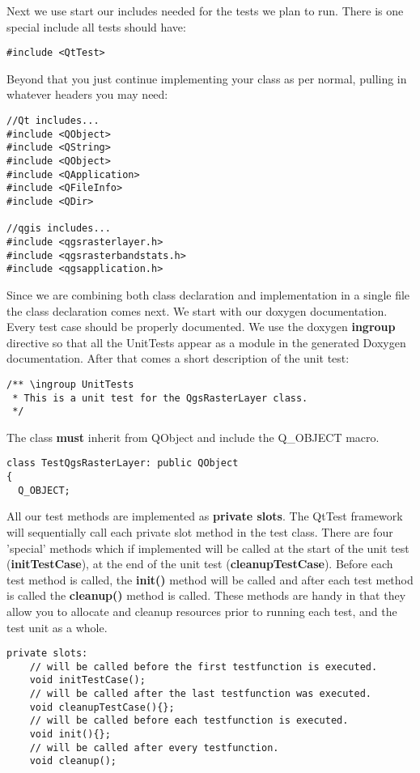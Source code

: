 Next we use start our includes needed for the tests we plan to run. There is 
one special include all tests should have:

\begin{verbatim}
#include <QtTest>
\end{verbatim}

Beyond that you just continue implementing your class as per normal, pulling 
in whatever headers you may need:

\begin{verbatim}
//Qt includes...
#include <QObject>
#include <QString>
#include <QObject>
#include <QApplication>
#include <QFileInfo>
#include <QDir>

//qgis includes...
#include <qgsrasterlayer.h> 
#include <qgsrasterbandstats.h> 
#include <qgsapplication.h>
\end{verbatim}

Since we are combining both class declaration and implementation in a single 
file the class declaration comes next. We start with our doxygen documentation. 
Every test case should be properly documented. We use the doxygen \textbf{ingroup} 
directive so that all the UnitTests appear as a module in the generated 
Doxygen documentation. After that comes a short description of the unit test:

\begin{verbatim}
/** \ingroup UnitTests
 * This is a unit test for the QgsRasterLayer class.
 */
\end{verbatim}

The class \textbf{must} inherit from QObject and include the Q\_OBJECT macro.

\begin{verbatim}
class TestQgsRasterLayer: public QObject
{
  Q_OBJECT;
\end{verbatim}

All our test methods are implemented as \textbf{private slots}. The QtTest framework 
will sequentially call each private slot method in the test class. There are 
four 'special' methods which if implemented will be called at the start of 
the unit test (\textbf{initTestCase}), at the end of the unit test (\textbf{cleanupTestCase}). 
Before each test method is called, the \textbf{init()} method will be called and 
after each test method is called the \textbf{cleanup()} method is called. These 
methods are handy in that they allow you to allocate and cleanup resources 
prior to running each test, and the test unit as a whole.

\begin{verbatim}
private slots:
    // will be called before the first testfunction is executed.
    void initTestCase();
    // will be called after the last testfunction was executed.
    void cleanupTestCase(){};
    // will be called before each testfunction is executed.
    void init(){};
    // will be called after every testfunction.
    void cleanup();
\end{verbatim}


